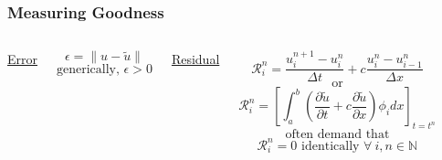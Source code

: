 \documentclass[]{beamer}
\newcommand{\N}{\mathbb{N}}
\newcommand{\pd}[2]{\frac{\partial #1}{\partial #2}}
\begin{document}
\begin{frame}
  \frametitle{Measuring Goodness}
  \begin{columns}
    \column{6cm}
    \begin{center}{\Large\underline{Error}}\end{center}
    \begin{center}
      $$\epsilon = \|u-\tilde{u}\|$$
      $$\text{generically, }\epsilon > 0$$
    \end{center}
    \column{6cm}
    \begin{center}{\Large\underline{Residual}}\end{center}
    \begin{center}
      $$\mathcal{R}_i^n = \frac{u_i^{n+1} - u_{i}^n}{\Delta t} + c \frac{u_{i}^n - u_{i-1}^n}{\Delta x}$$
        $$\text{or}$$
        $$\mathcal{R}_i^n = \left[\int_a^b\left(\pd{\tilde{u}}{t}+c\pd{\tilde{u}}{x}\right)\phi_idx\right]_{t=t^n}$$
      $$\text{often demand that}$$
      $$\mathcal{R}_i^n = 0\text{ identically }\forall\ i,n\in\N $$
    \end{center}
  \end{columns}
\end{frame}
\end{document}
